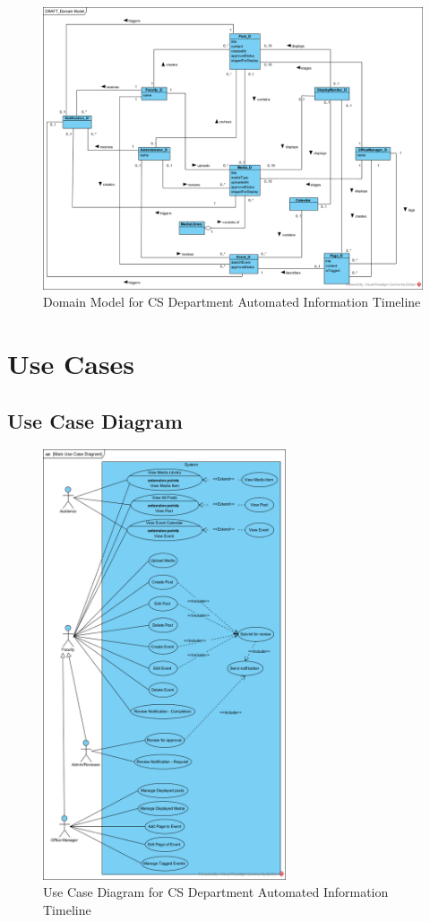 \documentclass{article}
\begin{document}
\begin{figure}[H]
    \centering
    \includegraphics[width=1.05\textwidth]{images/DomainModel.png}
    \centering
    \caption{Domain Model for CS Department Automated Information Timeline}
\end{figure}
\section{Use Cases}
\subsection{Use Case Diagram}
\begin{figure}[H]
    \centering
    \includegraphics[width=0.64\textwidth]{images/UCD.png}
    \centering
    \caption{Use Case Diagram for CS Department Automated Information Timeline}
\end{figure}
\end{document}
